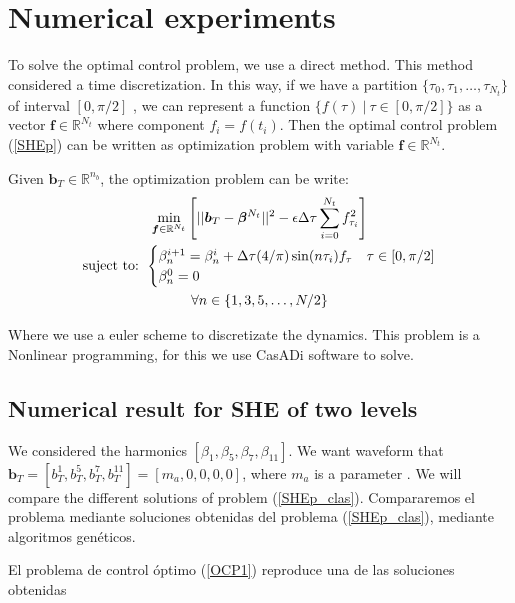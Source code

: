 \section{Numerical experiments}

To solve the optimal control problem, we use a direct method. %
%
This method considered a time discretization. In this way, if we have a partition $\{\tau_0,\tau_1,\dots,\tau_{N_t}\}$ of interval $[0,\pi/2]$ , we can represent a function $\{ f(\tau) \ | \ \tau \in [0,\pi/2]\}$ as a vector $\bm{f} \in \mathbb{R}^{N_t}$ where component $f_i = f(t_i)$. Then the optimal control problem (\ref{SHEp}) can be written as optimization problem with variable $\bm{f} \in \mathbb{R}^{N_t}$.

\begin{problem}
    Given  $\bm{b}_T  \in \mathbb{R}^{n_b}$,  the optimization problem can be write: 
    \begin{gather}
        \min_{\bm{f} \in \mathbb{R}^{N_t} } \Bigg[ || \bm{b}_T - \bm{\beta}^{N_t}||^2 - \epsilon \Delta\tau  \sum_{i=0}^{N_t} f_{\tau_i}^2 \Bigg]  \\
        \text{suject to: }
        \begin{cases}
            \beta_n^{i+1} = \beta_n^{i} + \Delta \tau (4/\pi) \sin(n\tau_i) f_\tau & \tau \in [0,\pi/2]\label{dyn}\\
            \beta_n^0 = 0
        \end{cases} \\
        \notag \forall n \in \{1,3,5,\dots,N/2 \}
    \end{gather}
\end{problem}

Where we use a euler scheme to discretizate the dynamics. This problem is a Nonlinear programming, for this we use CasADi software to solve.

\subsection{Numerical result for SHE of two levels}

We considered the harmonics $[\beta_1,\beta_5,\beta_7,\beta_{11}]$. We want waveform that  $\bm{b}_T = [b_T^1,b_T^5,b_T^7,b_T^{11}] = [m_a,0,0,0,0]$, where $m_a$ is a parameter . We will compare the different solutions of problem (\ref{SHEp_clas}).
Compararemos el problema mediante soluciones obtenidas del problema (\ref{SHEp_clas}), mediante algoritmos genéticos.

El problema de control óptimo (\ref{OCP1}) reproduce una de las soluciones obtenidas 

